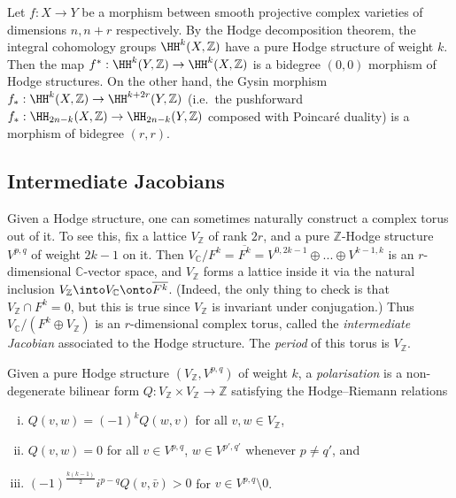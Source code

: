 \begin{example}
    Let \(f:X\to Y\) be a morphism between smooth projective complex varieties
    of dimensions \(n, n+r\) respectively. By the Hodge decomposition theorem,
    the integral cohomology groups \(\HH^k(X,\mathbb{Z})\) have a pure Hodge
    structure of weight \(k\). Then the map \(f^\ast:\HH^k(Y,\mathbb{Z})\to
    \HH^k(X,\mathbb{Z})\) is a bidegree \((0,0)\) morphism of Hodge structures.
    On the other hand, the Gysin morphism \(f_\ast:\HH^k(X,\mathbb{Z})\to
    \HH^{k+2r}(Y,\mathbb{Z})\) (i.e.\ the pushforward \(f_\ast :
    \HH_{2n-k}(X,\mathbb{Z})\to \HH_{2n-k}(Y,\mathbb{Z})\) composed with
    Poincar\'e duality) is a morphism of bidegree \((r,r)\).
\end{example}

\subsection{Intermediate Jacobians} Given a Hodge structure, one can sometimes
naturally construct a complex torus out of it. To see this, fix a lattice
\(V_\mathbb{Z}\) of rank \(2r\), and a pure \(\mathbb{Z}\)-Hodge structure
\(V^{p,q}\) of weight \(2k-1\) on it. Then \(V_\mathbb{C}/F^k = \overline{F^k}=
V^{0,2k-1}\oplus ... \oplus V^{k-1,k}\) is an \(r\)-dimensional
\(\mathbb{C}\)-vector space, and \(V_\mathbb{Z}\) forms a lattice inside it via
the natural inclusion \(V_\mathbb{Z}\into V_\mathbb{C}\onto \overline{F^k}\).
(Indeed, the only thing to check is that \(V_\mathbb{Z}\cap F^k=0\), but this is
true since \(V_\mathbb{Z}\) is invariant under conjugation.) Thus
\(V_\mathbb{C}/(F^k\oplus V_\mathbb{Z})\) is an \(r\)-dimensional complex torus,
called the \textit{intermediate Jacobian} associated to the Hodge structure. The
\textit{period} of this torus is \(V_\mathbb{Z}\).

\begin{definition}
    Given a pure Hodge structure \((V_\mathbb{Z}, V^{p,q})\) of weight \(k\), a
    \textit{polarisation} is a non-degenerate bilinear form
    \(Q:V_\mathbb{Z}\times V_\mathbb{Z}\to \mathbb{Z}\) satisfying the
    Hodge--Riemann relations
    \begin{enumerate}[(i)]
        \item \(Q(v,w)=(-1)^k Q(w,v)\) for all \(v,w\in V_\mathbb{Z}\),
        \item \(Q(v,w)=0\) for all \(v\in V^{p,q}\), \(w\in
            V^{p',q'}\) whenever \(p\neq q'\), and
        \item \((-1)^\frac{k(k-1)}{2}i^{p-q} Q(v,\bar v)>0\) for \(v \in
            V^{p,q}\setminus 0\).
    \end{enumerate}
\end{definition}

